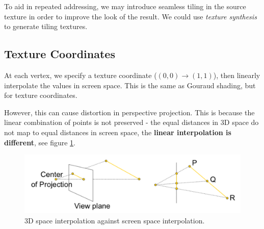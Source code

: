 \documentclass[11pt]{article}
\begin{document}
To aid in repeated addressing, we may introduce seamless tiling in the source texture in order to improve the look of the result.
We could use \textit{texture synthesis} to generate tiling textures.

\subsection{Texture Coordinates}
At each vertex, we specify a texture coordinate ($(0, 0) \rightarrow (1, 1)$), then linearly interpolate the values in screen space.
This is the same as Gouraud shading, but for texture coordinates.

However, this can cause distortion in perspective projection.
This is because the linear combination of points is not preserved - the equal distances in 3D space do not map to equal distances in screen space, the \textbf{linear interpolation is different}, see figure \ref{fig:distortion}.

\begin{figure}[htb!]
  \centering
  \caption{3D space interpolation against screen space interpolation.}
  \label{fig:distortion}
  \includegraphics[scale=0.3]{distortion}
\end{figure}
\end{document}
